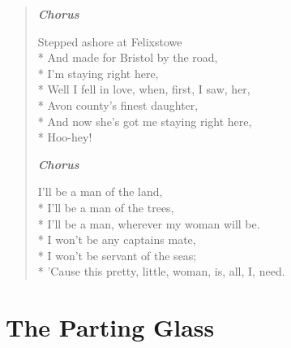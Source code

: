 \documentclass[9pt,twoside]{extarticle}
\newenvironment{xverse}{
	\begin{verse}
	\fontsize{8.5}{10.5}\selectfont
	}
	{
	\end{verse}
	\penalty 0
}
\newcommand{\chorusmark}[1][1]{%
\vspace{-0.5\stanzaskip}%
\textbf{\emph{Chorus \ifthenelse{\equal{#1}{1}}{}{$\times$ #1}}}%
\vspace{-0.5\stanzaskip}%
}
\begin{document}
\begin{xverse}
\chorusmark

Stepped ashore at Felixstowe \\*
And made for Bristol by the road, \\*
I’m staying right here, \\*
Well I fell in love, when, first, I saw, her, \\*
Avon county’s finest daughter, \\*
And now she’s got me staying right here, \\*
Hoo-hey!

\chorusmark

I’ll be a man of the land, \\*
I’ll be a man of the trees, \\*
I’ll be a man, wherever my woman will be. \\*
I won’t be any captains mate, \\*
I won’t be servant of the seas; \\*
’Cause this pretty, little, woman, is, all, I, need.
\end{xverse}

\section{The Parting Glass}
\end{document}
